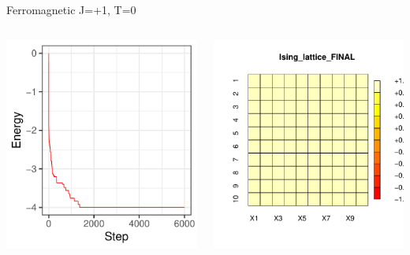 \documentclass{beamer}
\begin{document}
\begin{frame}{Ferromagnetic J=+1, T=0}
\begin{columns}
\begin{column}{0.5\textwidth}
    \begin{center}
     \includegraphics[width=\textwidth]{Pic/J+1_10_6000_T=0_ENERGY.pdf}
     \end{center}
\end{column}
\begin{column}{0.5\textwidth}
    \begin{center}
     \includegraphics[width=\textwidth]{Pic/J+1_10_6000_T=0_FINAL.pdf}

\end{center}
\end{column}
\end{columns}
\end{frame}
\end{document}
